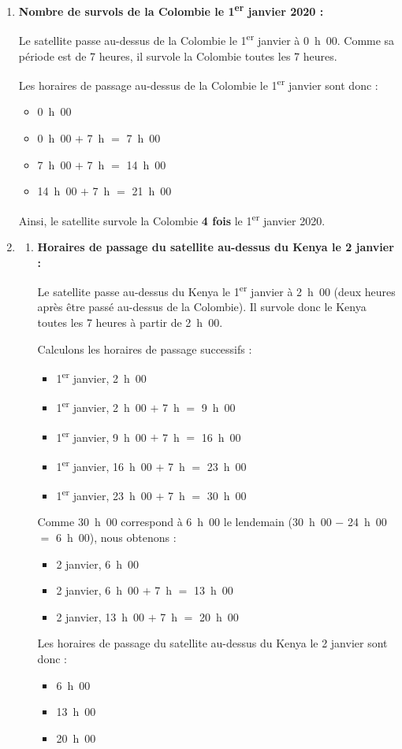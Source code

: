 \documentclass{article}
\begin{document}
\begin{enumerate}
    \item \textbf{Nombre de survols de la Colombie le 1\textsuperscript{er} janvier 2020 :}
    
    Le satellite passe au-dessus de la Colombie le 1\textsuperscript{er} janvier à 0~h~00. Comme sa période est de 7 heures, il survole la Colombie toutes les 7 heures.

    Les horaires de passage au-dessus de la Colombie le 1\textsuperscript{er} janvier sont donc :
    \begin{itemize}
        \item 0~h~00
        \item 0~h~00 $+$ 7~h $=$ 7~h~00
        \item 7~h~00 $+$ 7~h $=$ 14~h~00
        \item 14~h~00 $+$ 7~h $=$ 21~h~00
    \end{itemize}
    Ainsi, le satellite survole la Colombie \textbf{4 fois} le 1\textsuperscript{er} janvier 2020.
    
    \item
    \begin{enumerate}
        \item \textbf{Horaires de passage du satellite au-dessus du Kenya le 2 janvier :}
        
        Le satellite passe au-dessus du Kenya le 1\textsuperscript{er} janvier à 2~h~00 (deux heures après être passé au-dessus de la Colombie). Il survole donc le Kenya toutes les 7 heures à partir de 2~h~00.

        Calculons les horaires de passage successifs :
        \begin{itemize}
            \item 1\textsuperscript{er} janvier, 2~h~00
            \item 1\textsuperscript{er} janvier, 2~h~00 $+$ 7~h $=$ 9~h~00
            \item 1\textsuperscript{er} janvier, 9~h~00 $+$ 7~h $=$ 16~h~00
            \item 1\textsuperscript{er} janvier, 16~h~00 $+$ 7~h $=$ 23~h~00
            \item 1\textsuperscript{er} janvier, 23~h~00 $+$ 7~h $=$ 30~h~00
        \end{itemize}
        Comme 30~h~00 correspond à 6~h~00 le lendemain (30~h~00 $-$ 24~h~00 $=$ 6~h~00), nous obtenons :
        \begin{itemize}
            \item 2 janvier, 6~h~00
            \item 2 janvier, 6~h~00 $+$ 7~h $=$ 13~h~00
            \item 2 janvier, 13~h~00 $+$ 7~h $=$ 20~h~00
        \end{itemize}
        Les horaires de passage du satellite au-dessus du Kenya le 2 janvier sont donc :
        \begin{itemize}
            \item 6~h~00
            \item 13~h~00
            \item 20~h~00
        \end{itemize}
        

\end{enumerate}
\end{enumerate}
\end{document}
